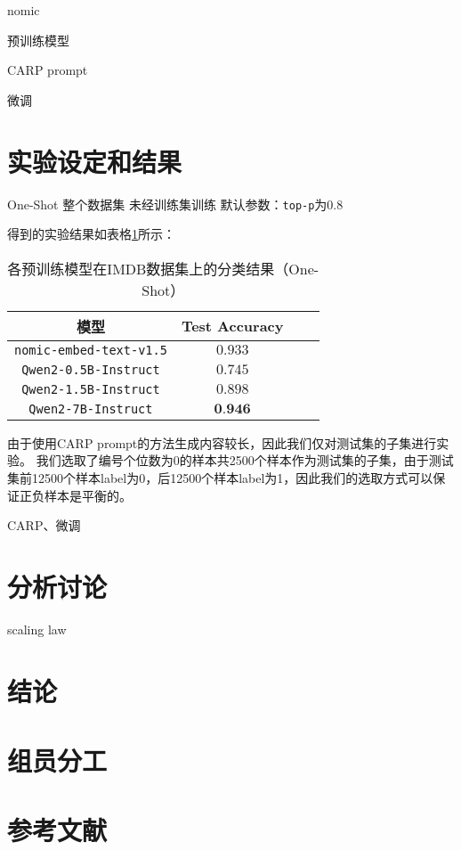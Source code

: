 \documentclass{article}
\begin{document}
nomic

预训练模型

CARP prompt

微调

\section{实验设定和结果}

One-Shot
整个数据集
未经训练集训练
默认参数：\verb|top-p|为0.8

得到的实验结果如表格\ref{tab:pretrained_results}所示：
\begin{table}[htbp]
  \caption{\small{各预训练模型在IMDB数据集上的分类结果（One-Shot）}}
  \label{tab:pretrained_results}
  \centering
  \begin{tabular}{cccc}
    \toprule
    模型                   & Test Accuracy    \\
    \midrule
    \verb|nomic-embed-text-v1.5| & $0.933$          \\
    \midrule
    \verb|Qwen2-0.5B-Instruct| & $0.745$          \\
    \midrule
    \verb|Qwen2-1.5B-Instruct| & $0.898$          \\
    \midrule
    \verb|Qwen2-7B-Instruct| & $\textbf{0.946}$ \\
    \bottomrule
  \end{tabular}
\end{table}

由于使用CARP prompt的方法生成内容较长，因此我们仅对测试集的子集进行实验。
我们选取了编号个位数为0的样本共2500个样本作为测试集的子集，由于测试集前12500个样本label为0，后12500个样本label为1，因此我们的选取方式可以保证正负样本是平衡的。

CARP、微调

\section{分析讨论}

scaling law

\section{结论}


\section{组员分工}

\section{参考文献}
\end{document}
